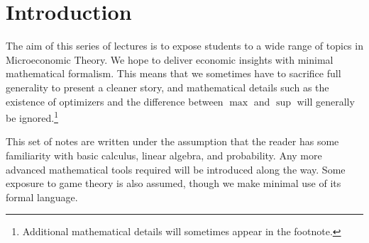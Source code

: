 \chapter{Introduction}

The aim of this series of lectures is to expose students to a wide range of topics in Microeconomic Theory.
We hope to deliver economic insights with minimal mathematical formalism.
This means that we sometimes have to sacrifice full generality to present a cleaner story, and mathematical details such as the existence of optimizers and the difference between \(\max\) and \(\sup\) will generally be ignored.\footnote{Additional mathematical details will sometimes appear in the footnote.}


This set of notes are written under the assumption that the reader has some familiarity with basic calculus, linear algebra, and probability.
Any more advanced mathematical tools required will be introduced along the way.
Some exposure to game theory is also assumed, though we make minimal use of its formal language.

